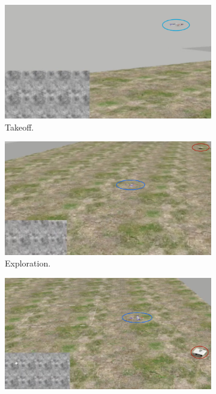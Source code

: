 \begin{figure}[!htbp]
  \centering
   \begin{subfigure}[b]{0.45\textwidth}
        \includegraphics[width=\textwidth]{img/takeoff3.jpg}
        \caption{Takeoff.}
   \end{subfigure}\hfill
   \begin{subfigure}[b]{0.45\textwidth}
        \includegraphics[width=\textwidth]{img/exploring3.jpg}
        \caption{Exploration.}
        \label{fig:two}
   \end{subfigure}\hfill
    \begin{subfigure}[b]{0.45\textwidth}
        \includegraphics[width=\textwidth]{img/following3.jpg}

\end{subfigure}
\end{figure}
